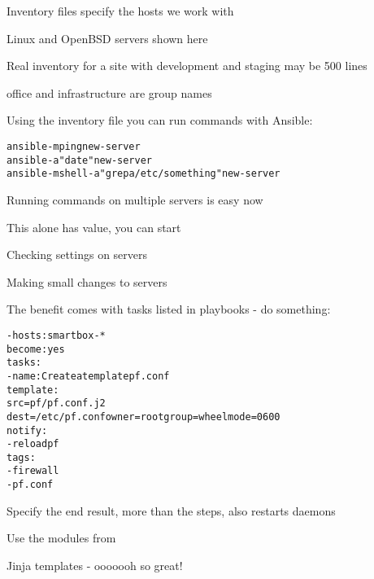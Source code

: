 \documentclass[Screen16to9,17pt]{foils}
\begin{document}
\begin{list2}
\item Inventory files specify the hosts we work with
\item Linux and OpenBSD servers shown here
\item Real inventory for a site with development and staging may be 500 lines
\item office and infrastructure are group names
\end{list2}



Using the inventory file you can run commands with Ansible:

\begin{alltt}\footnotesize
  ansible -m ping new-server
  ansible -a "date" new-server
  ansible -m shell -a "grep a /etc/something" new-server
\end{alltt}

\begin{list2}
\item Running commands on multiple servers is easy now
\item This alone has value, you can start
\item Checking settings on servers
\item Making small changes to servers
\end{list2}



The benefit comes with tasks listed in playbooks - do something:

\begin{alltt}\footnotesize
  - hosts: smartbox-*
    become: yes
    tasks:
    - name: Create a template pf.conf
      template:
        src=pf/pf.conf.j2
        dest=/etc/pf.conf owner=root group=wheel mode=0600
     notify:
        - reload pf
      tags:
        - firewall
        - pf.conf
\end{alltt}

\begin{list2}
\item Specify the end result, more than the steps, also restarts daemons
\item Use the modules from\\
\item Jinja templates - ooooooh so great!
\end{list2}
\end{document}

